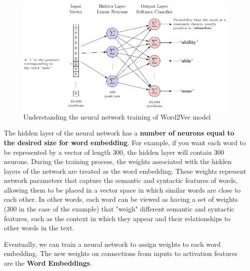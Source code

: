 \begin{figure}[!htbp]
    \centering
    \includegraphics[width=\linewidth]{tikz/chapter7 - Word2Vec Architecture.pdf}
    \caption{Understanding the neural network training of Word2Vec model}
\end{figure}

The hidden layer of the neural network has a \textbf{number of neurons equal to the desired size for word embedding}. For example, if you want each word to be represented by a vector of length 300, the hidden layer will contain 300 neurons. During the training process, the weights associated with the hidden layers of the network are treated as the word embedding. These weights represent network parameters that capture the semantic and syntactic features of words, allowing them to be placed in a vector space in which similar words are close to each other. In other words, each word can be viewed as having a set of weights (300 in the case of the example) that "weigh" different semantic and syntactic features, such as the context in which they appear and their relationships to other words in the text.

Eventually, we can train a neural network to assign weights to each word embedding. The new weights on connections from inputs to activation features are the \textbf{Word Embeddings}.






